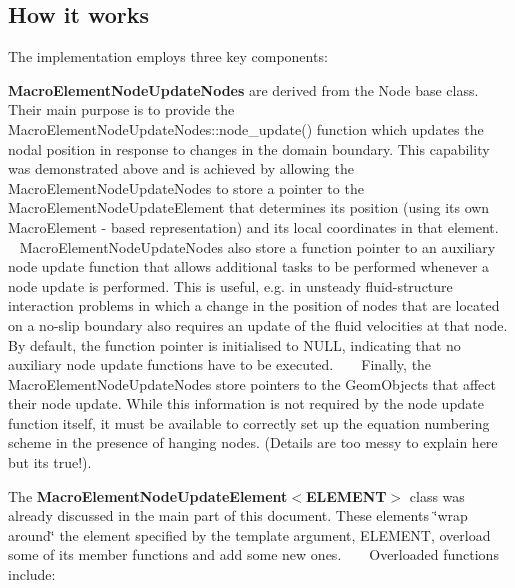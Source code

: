 \hypertarget{index_how_it_works}{}\subsection{How it works}\label{index_how_it_works}
The implementation employs three key components\+:
\begin{DoxyItemize}
\item {\bfseries {\ttfamily Macro\+Element\+Node\+Update\+Nodes}} are derived from the {\ttfamily Node} base class. Their main purpose is to provide the {\ttfamily Macro\+Element\+Node\+Update\+Nodes\+::node\+\_\+update()} function which updates the nodal position in response to changes in the domain boundary. This capability was demonstrated above and is achieved by allowing the {\ttfamily Macro\+Element\+Node\+Update\+Nodes} to store a pointer to the {\ttfamily Macro\+Element\+Node\+Update\+Element} that determines its position (using its own {\ttfamily Macro\+Element} -\/ based representation) and its local coordinates in that element. ~\newline
~\newline
 {\ttfamily Macro\+Element\+Node\+Update\+Nodes} also store a function pointer to an auxiliary node update function that allows additional tasks to be performed whenever a node update is performed. This is useful, e.\+g. in unsteady fluid-\/structure interaction problems in which a change in the position of nodes that are located on a no-\/slip boundary also requires an update of the fluid velocities at that node. By default, the function pointer is initialised to N\+U\+LL, indicating that no auxiliary node update functions have to be executed. ~\newline
~\newline
 Finally, the {\ttfamily Macro\+Element\+Node\+Update\+Nodes} store pointers to the {\ttfamily Geom\+Objects} that affect their node update. While this information is not required by the node update function itself, it must be available to correctly set up the equation numbering scheme in the presence of hanging nodes. (Details are too messy to explain here but it\textquotesingle{}s true!). ~\newline
~\newline

\item The {\bfseries {\ttfamily Macro\+Element\+Node\+Update\+Element$<$\+E\+L\+E\+M\+E\+N\+T$>$}} class was already discussed in the main part of this document. These elements \char`\"{}wrap around\char`\"{} the element specified by the template argument, {\ttfamily E\+L\+E\+M\+E\+NT}, overload some of its member functions and add some new ones. ~\newline
 ~\newline
 Overloaded functions include\+: ~\newline
~\newline


\end{DoxyItemize}

